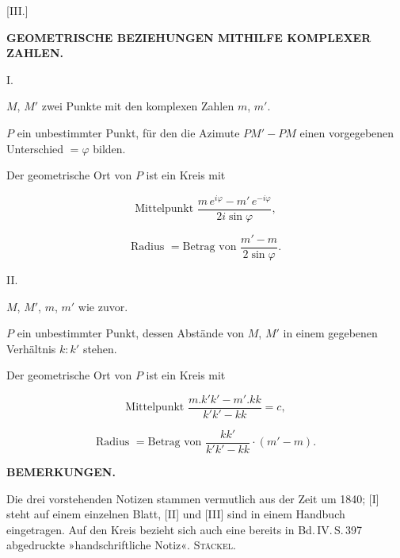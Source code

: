 
\begin{center}
[III.]

\textbf{GEOMETRISCHE BEZIEHUNGEN MITHILFE KOMPLEXER ZAHLEN.}

I.
\end{center}

$M$, $M'$ zwei Punkte mit den komplexen Zahlen $m$, $m'$.

$P$ ein unbestimmter Punkt, für den die Azimute $PM'-PM$ einen vorgegebenen
Unterschied $= \varphi$ bilden.

Der geometrische Ort von $P$ ist ein Kreis mit

\[
\text{Mittelpunkt } \frac{m\,e^{i\varphi}-m'\,e^{-i\varphi}}{2i\sin\varphi},
\]

\[
\text{Radius } = \text{Betrag von } \frac{m'-m}{2\sin\varphi}.
\]

\begin{center}
II.
\end{center}

$M$, $M'$, $m$, $m'$ wie zuvor.

$P$ ein unbestimmter Punkt, dessen Abstände von $M$, $M'$ in einem gegebenen Verhältnis $k:k'$ stehen.

Der geometrische Ort von $P$ ist ein Kreis mit

\[
\text{Mittelpunkt } \frac{m.k'k'-m'.kk}{k'k'-kk} = c,
\]

\[
\text{Radius } = \text{Betrag von } \frac{kk'}{k'k'-kk}\cdot(m'-m).
\]



\begin{center}
\textbf{BEMERKUNGEN.}
\end{center}

Die drei vorstehenden Notizen stammen vermutlich aus der Zeit um 1840;
[I] steht auf einem einzelnen Blatt, [II] und [III] sind in einem Handbuch
eingetragen. Auf den Kreis bezieht sich auch eine bereits in Bd.\,IV.\,S.\,397 abgedruckte
»handschriftliche Notiz«. \hfill \textsc{Stäckel}.
